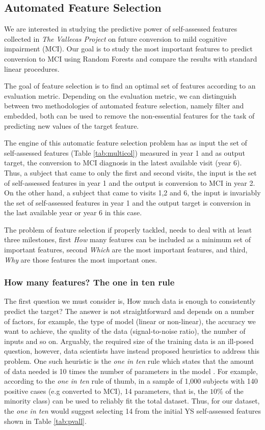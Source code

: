 \documentclass[preprint,12pt]{elsarticle}
\begin{document}
\subsection{Automated Feature Selection}
We are interested in studying the predictive power of self-assessed features collected in \emph{The Vallecas Project} on future conversion to mild cognitive impairment (MCI). Our goal is to study the most important features to predict conversion to MCI using Random Forests and compare the results with standard linear procedures. 

The goal of feature selection is to find an optimal set of features according to an evaluation metric. Depending on the evaluation metric, we can distinguish between two methodologies of automated feature selection, namely filter and embedded, both can be used to remove the non-essential features for the task of predicting new values of the target feature. 

The engine of this automatic feature selection problem has as input the set of self-assessed features (Table \ref{tab:multicol}) measured in year 1 and as output target, the conversion to MCI diagnosis in the latest available visit (year 6). Thus, a subject that came to only the first and second visits, the input is the set of self-assessed features in year 1 and the output is conversion to MCI in year 2. On the other hand, a subject that came to visits 1,2 and 6, the input is invariably the set of self-assessed features in year 1 and the output target is conversion in the last available year or year 6 in this case. %

The problem of feature selection if properly tackled, needs to deal with at least three milestones, first \emph{How} many features can be included as a minimum set of important features, second \emph{Which} are the most important features, and third, \emph{Why} are those features the most important ones.  

\subsubsection{How many features? The one in ten rule}
The first question we must consider is, How much data is enough to consistently predict the target? The answer is not straightforward and depends on a number of factors, for example, the type of model (linear or non-linear), the accuracy we want to achieve, the quality of the data (signal-to-noise ratio), the number of inputs and so on. Arguably, the required size of the training data is an ill-posed question, however, data scientists have instead proposed heuristics to address this problem. One such heuristic is the \emph{one in ten} rule which states that the amount of data needed is 10 times the number of parameters in the model \cite{harrell2001reg}. For example, according to the \emph{one in ten} rule of thumb, in a sample of 1,000 subjects with 140 positive cases (e.g converted to MCI), 14 parameters, that is, the $10\%$ of the minority class) can be used to reliably fit the total dataset. Thus, for our dataset, the \emph{one in ten} would suggest selecting 14 from the initial YS self-assessed features shown in Table \ref{tab:pvall}. 
\end{document}
